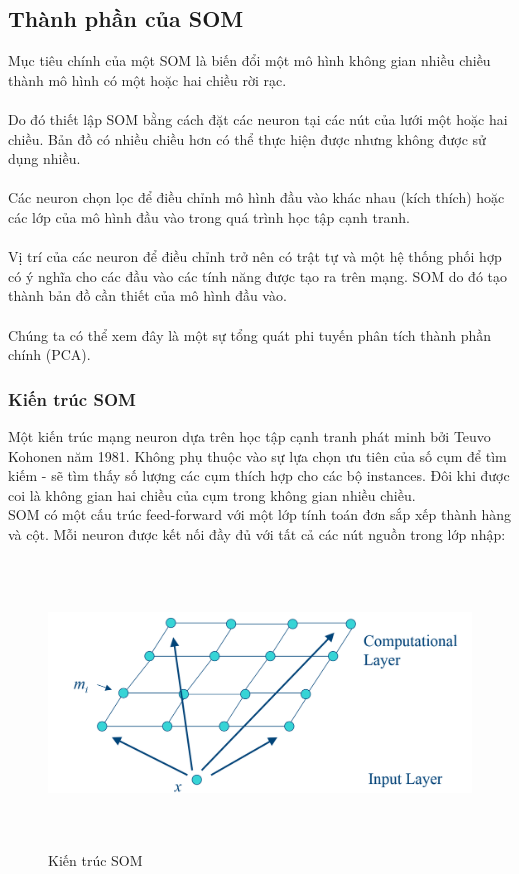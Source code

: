 \subsection{Thành phần của SOM}
Mục tiêu chính của một SOM là biến đổi một mô hình không gian nhiều chiều thành
mô hình có một hoặc hai chiều rời rạc.\\\\
Do đó thiết lập SOM bằng cách đặt các neuron tại các nút của lưới một hoặc hai
chiều. Bản đồ có nhiều chiều hơn có thể thực hiện được nhưng không được sử dụng
nhiều.\\\\
Các neuron chọn lọc để điều chỉnh mô hình đầu vào khác nhau (kích thích) hoặc
các lớp của mô hình đầu vào trong quá trình học tập cạnh tranh.\\\\
Vị trí của các neuron để điều chỉnh trở nên có trật tự và một hệ thống phối hợp
có ý nghĩa cho các đầu vào các tính năng được tạo ra trên mạng. SOM do đó tạo
thành bản đồ cần thiết của mô hình đầu vào.\\\\ 
Chúng ta có thể xem đây là một sự tổng quát phi tuyến phân tích thành phần chính
(PCA).
  \subsubsection{Kiến trúc SOM}
  Một kiến trúc mạng neuron dựa trên học tập cạnh tranh phát minh bởi Teuvo
  Kohonen năm 1981. Không phụ thuộc vào sự lựa chọn ưu tiên của số cụm để tìm
  kiếm - sẽ tìm thấy số lượng các cụm thích hợp cho các bộ instances.  Đôi khi
  được coi là không gian hai chiều của cụm trong không gian nhiều
  chiều.\\ 
  SOM có một cấu trúc feed-forward với một lớp tính toán đơn
  sắp xếp thành hàng và cột. Mỗi neuron được kết nối đầy đủ với tất cả các nút nguồn trong lớp nhập:\\ 
  \begin{figure}[h!]
  	\centering
	\includegraphics[width=6in,height=3in,keepaspectratio=true]{SOM1.png}
	\caption{Kiến trúc SOM}
  \end{figure}
